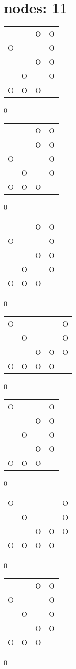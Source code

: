 \section{nodes: 11}
\begin{tabular}{|m{0.2cm}m{0.2cm}m{0.2cm}m{0.2cm}|}\hline
 & &O&O\\
O& & &O\\
 & &O&O\\
 &O& &O\\
O&O&O& \\
\hline\end{tabular}0
\begin{tabular}{|m{0.2cm}m{0.2cm}m{0.2cm}m{0.2cm}|}\hline
 & &O&O\\
 & &O&O\\
O& & &O\\
 &O& &O\\
O&O&O& \\
\hline\end{tabular}0
\begin{tabular}{|m{0.2cm}m{0.2cm}m{0.2cm}m{0.2cm}|}\hline
 & &O&O\\
O& & &O\\
 & &O&O\\
 &O& &O\\
O&O&O& \\
\hline\end{tabular}0
\begin{tabular}{|m{0.2cm}m{0.2cm}m{0.2cm}m{0.2cm}m{0.2cm}|}\hline
O& & & &O\\
 &O& & &O\\
 & &O&O&O\\
O&O&O&O& \\
\hline\end{tabular}0
\begin{tabular}{|m{0.2cm}m{0.2cm}m{0.2cm}m{0.2cm}|}\hline
O& & &O\\
 & &O&O\\
 &O& &O\\
 & &O&O\\
O&O&O& \\
\hline\end{tabular}0
\begin{tabular}{|m{0.2cm}m{0.2cm}m{0.2cm}m{0.2cm}m{0.2cm}|}\hline
O& & & &O\\
 &O& & &O\\
 & &O&O&O\\
O&O&O&O& \\
\hline\end{tabular}0
\begin{tabular}{|m{0.2cm}m{0.2cm}m{0.2cm}m{0.2cm}|}\hline
 & &O&O\\
O& & &O\\
 &O& &O\\
 & &O&O\\
O&O&O& \\
\hline\end{tabular}0
